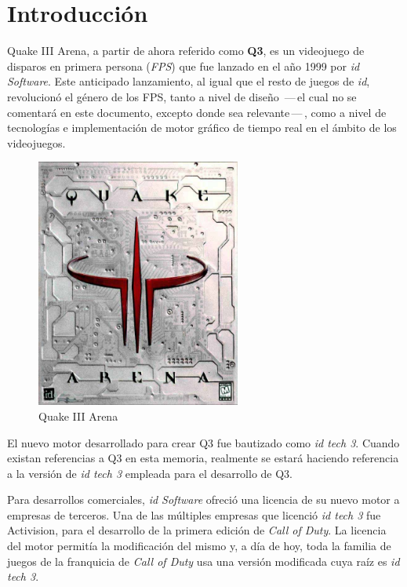 \documentclass[a4paper,12pt]{report}
\begin{document}
	
	\tableofcontents
	\clearpage
	

	\section{Introducción}
	Quake III Arena, a partir de ahora referido como \textbf{Q3}, es un videojuego de disparos en primera persona (\textit{FPS}) que fue lanzado en el año 1999 por \textit{id Software}. Este anticipado lanzamiento, al igual que el resto de juegos de \textit{id}, revolucionó el género de los FPS, tanto a nivel de diseño \,---\,el cual no se comentará en este documento, excepto donde sea relevante\,---\,, como a nivel de tecnologías e implementación de motor gráfico de tiempo real en el ámbito de los videojuegos. \cite{quake3}\\
	
	\begin{center}
		\begin{figure}[h]
			\centering
			\includegraphics[width=0.6\textwidth]{images/q3}
			\caption{Quake III Arena}
			\label{fig:portada}
		\end{figure}
	\end{center}

	El nuevo motor desarrollado para crear Q3 fue bautizado como \textit{id tech 3}. Cuando existan referencias a Q3 en esta memoria, realmente se estará haciendo referencia a la versión de \textit{id tech 3} empleada para el desarrollo de Q3. 
	
	Para desarrollos comerciales, \textit{id Software} ofreció una licencia de su nuevo motor a empresas de terceros. Una de las múltiples empresas que licenció \textit{id tech 3} fue Activision, para el desarrollo de la primera edición de \textit{Call of Duty}. La licencia del motor permitía la modificación del mismo y, a día de hoy, toda la familia de juegos de la franquicia de \textit{Call of Duty} usa una versión modificada cuya raíz es \textit{id tech 3}. \cite{idtech3}\\
	
\end{document}
